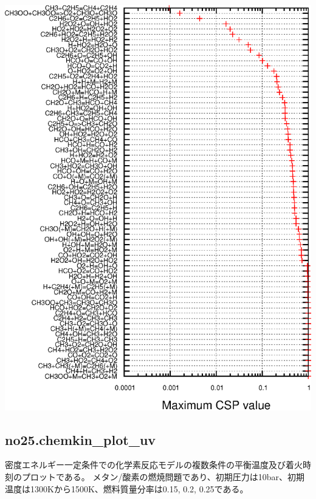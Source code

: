 \documentclass{jsarticle}
\begin{document}
\begin{center}
\includegraphics[height=\textheight]{sample/no24.3.eps}
\end{center}
\subsection{no25.chemkin\_plot\_uv}%
密度エネルギー一定条件での化学素反応モデルの複数条件の平衡温度及び着火時刻のプロットである。
メタン/酸素の燃焼問題であり、初期圧力は10bar、初期温度は1300Kから1500K、燃料質量分率は0.15, 0.2, 0.25である。
\end{document}
